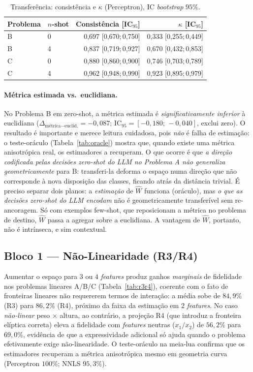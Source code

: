 \documentclass[12pt,a4paper]{article}
\newcommand{\West}{\ensuremath{\hat{W}}}   %
\begin{document}
\begin{table}[ht]
\centering
\caption{Transferência: consistência e $\kappa$ (Perceptron), IC \emph{bootstrap} $95\%$.}
\label{tab:fase_bc}
\begin{tabular}{llrr}
\toprule
\textbf{Problema} & \textbf{$n$-shot} & \textbf{Consistência [IC$_{95}$]} &
\textbf{$\kappa$ [IC$_{95}$]} \\
\midrule
B & 0 & 0,697 [0,670;\,0,750] & 0,333 [0,255;\,0,449] \\
B & 4 & 0,837 [0,719;\,0,927] & 0,670 [0,432;\,0,853] \\
\midrule
C & 0 & 0,880 [0,860;\,0,900] & 0,746 [0,703;\,0,789] \\
C & 4 & 0,962 [0,948;\,0,990] & 0,923 [0,895;\,0,979] \\
\bottomrule
\end{tabular}
\end{table}

\paragraph{Métrica estimada vs.\ euclidiana.}
No Problema B em zero-shot, a métrica estimada é \emph{significativamente inferior} à
euclidiana ($\Delta_{\text{métrica}-\text{euclid.}} = -0{,}087$;
IC$_{95} = [-0{,}180;\,-0{,}040]$, exclui zero). O resultado é importante e merece leitura
cuidadosa, pois \emph{não} é falha de estimação: o teste-oráculo
(Tabela~\ref{tab:oracle}) mostra que, quando existe uma métrica anisotrópica real, os
estimadores a recuperam. O que ocorre é que \emph{a direção codificada pelas decisões
zero-shot do LLM no Problema A não generaliza geometricamente} para B: transferi-la deforma
o espaço numa direção que não corresponde à nova disposição das classes, ficando atrás da
distância trivial. É preciso separar dois planos: a \emph{estimação} de \West{} funciona
(oráculo), mas \emph{o que as decisões zero-shot do LLM encodam} não é geometricamente
transferível sem re-ancoragem. Só com exemplos few-shot, que reposicionam a métrica no
problema de destino, \West{} passa a agregar sobre a euclidiana. A vantagem de \West{}, portanto,
não é intrínseca, e sim contextual.

\subsection{Bloco 1 — Não-Linearidade (R3/R4)}

Aumentar o espaço para $3$ ou $4$ \emph{features} produz ganhos \emph{marginais} de
fidelidade nos problemas lineares A/B/C (Tabela~\ref{tab:r3r4}), coerente com o fato de
fronteiras lineares não requererem termos de interação: a média sobe de $84{,}9\%$ (R3)
para $86{,}2\%$ (R4), próximo da faixa da estimação em $2$ \emph{features}. No caso
\emph{não-linear} peso $\times$ altura, ao contrário, a projeção R4 (que introduz a
fronteira elíptica correta) eleva a fidelidade com \emph{features} neutras ($x_1/x_2$) de
$56{,}2\%$ para $69{,}0\%$, evidência de que a expressividade adicional só ajuda quando o
problema efetivamente exige não-linearidade. O teste-oráculo na meia-lua confirma que os
estimadores recuperam a métrica anisotrópica mesmo em geometria curva (Perceptron $100\%$;
NNLS $95{,}3\%$).
\end{document}
